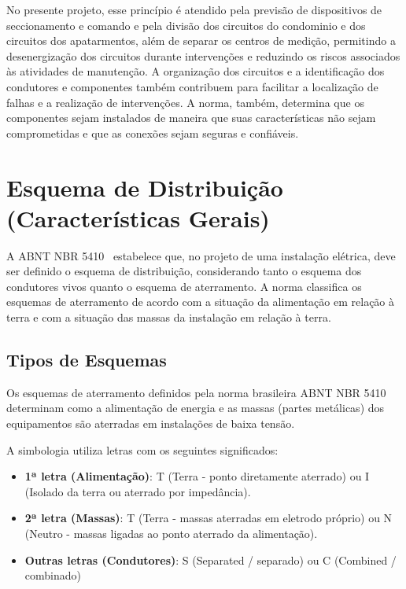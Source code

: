\documentclass[12pt,openright,oneside,a4paper,brazil]{abntex2}
\begin{document}
\begin{enumerate}[label=\roman*)]
        \hspace{1.27cm} No presente projeto, esse princípio é atendido pela previsão de dispositivos de seccionamento e comando e pela divisão dos circuitos do condominio e dos circuitos dos apatarmentos, além de separar os centros de medição, permitindo a desenergização dos circuitos durante intervenções e reduzindo os riscos associados às atividades de manutenção. A organização dos circuitos e a identificação dos condutores e componentes também contribuem para facilitar a localização de falhas e a realização de intervenções. A norma, também, determina que os componentes sejam instalados de maneira que suas características não sejam comprometidas e que as conexões sejam seguras e confiáveis.


    \end{enumerate}

\section{Esquema de Distribuição (Características Gerais)}

\hspace{1.27cm}A ABNT NBR 5410~\cite{nbr5410} estabelece que, no projeto de uma instalação elétrica, deve ser definido o esquema de distribuição, considerando tanto o esquema dos condutores vivos quanto o esquema de aterramento. A norma classifica os esquemas de aterramento de acordo com a situação da alimentação em relação à terra e com a situação das massas da instalação em relação à terra.

\subsection{Tipos de Esquemas}

\hspace{1.27cm} Os esquemas de aterramento definidos pela norma brasileira ABNT NBR 5410~\cite{nbr5410} determinam como a alimentação de energia e as massas (partes metálicas) dos equipamentos são aterradas em instalações de baixa tensão.

A simbologia utiliza letras com os seguintes significados:
\begin{itemize}
    \item \textbf{1ª letra (Alimentação)}: T (Terra - ponto diretamente aterrado) ou I (Isolado da terra ou aterrado por impedância).
    \item \textbf{2ª letra (Massas)}: T (Terra - massas aterradas em eletrodo próprio) ou N (Neutro - massas ligadas ao ponto aterrado da alimentação).
    \item \textbf{Outras letras (Condutores)}: S (Separated / separado) ou C (Combined / combinado)
\end{itemize}
\end{document}
